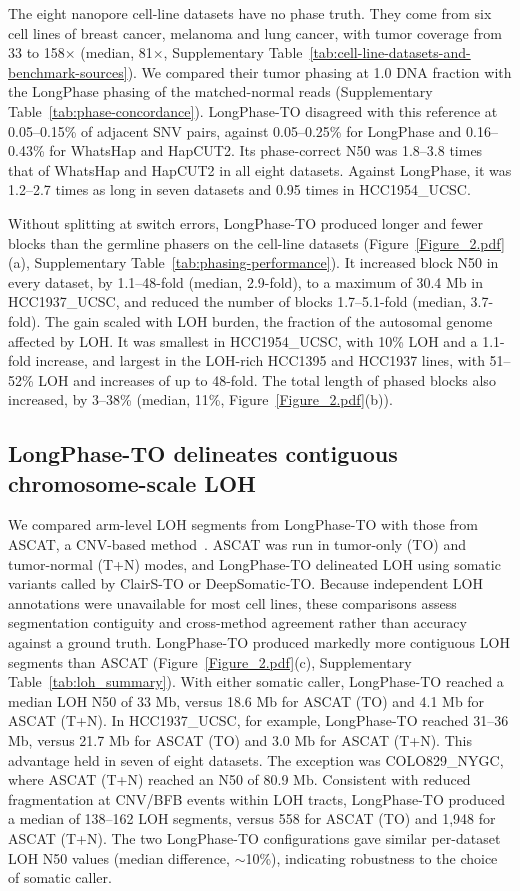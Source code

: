 \documentclass[unnumsec,webpdf,contemporary,large]{oup-authoring-template}
\begin{document}
The eight nanopore cell-line datasets have no phase truth. They come from six cell lines of breast cancer, melanoma and lung cancer, with tumor coverage from 33 to 158$\times$ (median, 81$\times$, Supplementary Table~\ref{tab:cell-line-datasets-and-benchmark-sources}). We compared their tumor phasing at 1.0 DNA fraction with the LongPhase phasing of the matched-normal reads (Supplementary Table~\ref{tab:phase-concordance}). LongPhase-TO disagreed with this reference at 0.05--0.15\% of adjacent SNV pairs, against 0.05--0.25\% for LongPhase and 0.16--0.43\% for WhatsHap and HapCUT2. Its phase-correct N50 was 1.8--3.8 times that of WhatsHap and HapCUT2 in all eight datasets. Against LongPhase, it was 1.2--2.7 times as long in seven datasets and 0.95 times in HCC1954\_UCSC.

Without splitting at switch errors, LongPhase-TO produced longer and fewer blocks than the germline phasers on the cell-line datasets (Figure~\ref{Figure_2.pdf}(a), Supplementary Table~\ref{tab:phasing-performance}). It increased block N50 in every dataset, by 1.1--48-fold (median, 2.9-fold), to a maximum of 30.4 Mb in HCC1937\_UCSC, and reduced the number of blocks 1.7--5.1-fold (median, 3.7-fold). The gain scaled with LOH burden, the fraction of the autosomal genome affected by LOH. It was smallest in HCC1954\_UCSC, with 10\% LOH and a 1.1-fold increase, and largest in the LOH-rich HCC1395 and HCC1937 lines, with 51--52\% LOH and increases of up to 48-fold. The total length of phased blocks also increased, by 3--38\% (median, 11\%, Figure~\ref{Figure_2.pdf}(b)).

\subsection{LongPhase-TO delineates contiguous chromosome-scale LOH}
We compared arm-level LOH segments from LongPhase-TO with those from ASCAT, a CNV-based method~\cite{vanloo2010}. ASCAT was run in tumor-only (TO) and tumor-normal (T+N) modes, and LongPhase-TO delineated LOH using somatic variants called by ClairS-TO or DeepSomatic-TO. Because independent LOH annotations were unavailable for most cell lines, these comparisons assess segmentation contiguity and cross-method agreement rather than accuracy against a ground truth. LongPhase-TO produced markedly more contiguous LOH segments than ASCAT (Figure~\ref{Figure_2.pdf}(c), Supplementary Table~\ref{tab:loh_summary}). With either somatic caller, LongPhase-TO reached a median LOH N50 of 33 Mb, versus 18.6 Mb for ASCAT (TO) and 4.1 Mb for ASCAT (T+N). In HCC1937\_UCSC, for example, LongPhase-TO reached 31--36 Mb, versus 21.7 Mb for ASCAT (TO) and 3.0 Mb for ASCAT (T+N). This advantage held in seven of eight datasets. The exception was COLO829\_NYGC, where ASCAT (T+N) reached an N50 of 80.9 Mb. Consistent with reduced fragmentation at CNV/BFB events within LOH tracts, LongPhase-TO produced a median of 138--162 LOH segments, versus 558 for ASCAT (TO) and 1,948 for ASCAT (T+N). The two LongPhase-TO configurations gave similar per-dataset LOH N50 values (median difference, $\sim$10\%), indicating robustness to the choice of somatic caller.
\end{document}
